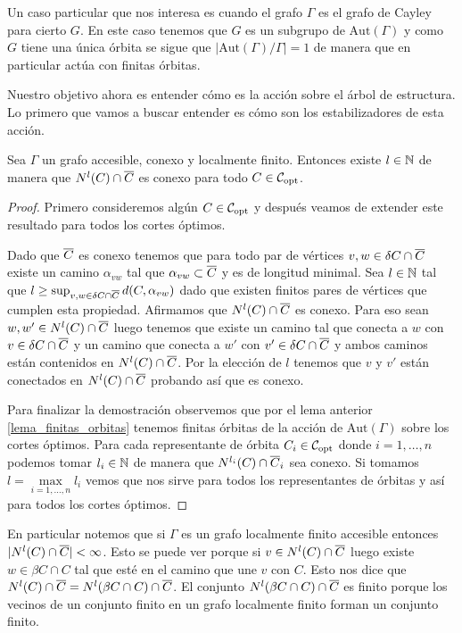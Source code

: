 \documentclass[tesis.tex]{subfiles}
\newcommand{\aut}{\text{Aut}}
\begin{document}
\begin{obs}
	Un caso particular que nos interesa es cuando el grafo $\Gamma$ es el grafo de Cayley para cierto \fg $G$.
	En este caso tenemos que $G$ es un subgrupo de $\aut(\Gamma)$ y como $G$ tiene una única órbita se sigue que $|\aut(\Gamma)/\Gamma| = 1$ de manera que en particular actúa con finitas órbitas.		
\end{obs}

Nuestro objetivo ahora es entender cómo es la acción sobre el árbol de estructura. 
Lo primero que vamos a buscar entender es cómo son los estabilizadores de esta acción.

\begin{lema}\label{lema_nlC_cap_olC_conexo}
	Sea $\Gamma$ un grafo accesible, conexo y localmente finito.
	Entonces existe $l \in \mathbb{N}$ de manera que $N^l(C) \cap \overline C$ es conexo para todo $C \in {\cal C}_{\text{opt}}$.
\end{lema}
\begin{proof}
	Primero consideremos algún $C \in {\cal C}_{\text{opt}}$ y después veamos de extender este resultado para todos los cortes óptimos.
	
	Dado que $\overline C$ es conexo tenemos que para todo par de vértices $v,w \in \delta C \cap \overline C$ existe un camino $\alpha_{vw}$ tal que $\alpha_{vw} \subset \overline C$ y es de longitud minimal.
	Sea $l \in \mathbb{N}$ tal que $l \ge \sup_{v,w \in \delta C \cap \overline C} d(C,\alpha_{vw})$ dado que existen finitos pares de vértices que cumplen esta propiedad.
	Afirmamos que $N^{l}(C) \cap \overline C$ es conexo.
	Para eso sean $w,w' \in N^{l}(C) \cap \overline C$ luego tenemos que existe un camino tal que conecta a $w$ con $v  \in \delta C \cap \overline C$ y un camino que conecta a $w'$ con $v' \in \delta C \cap \overline C$ y ambos caminos están contenidos en $N^{l}(C) \cap \overline C$.
	Por la elección de $l$ tenemos que $v$ y $v'$ están conectados en $N^l(C) \cap \overline C$ probando así que es conexo.
	

	Para finalizar la demostración observemos que por el lema anterior \ref{lema_finitas_orbitas} tenemos finitas órbitas de la acción de $\aut(\Gamma)$ sobre los cortes óptimos.
	Para cada representante de órbita $C_i \in {\cal C}_{\text{opt}}$ donde $i=1,\dots,n$ podemos tomar $l_i \in \mathbb{N}$ de manera que $ N^{l_{i}}(C_{\textit{}}) \cap \overline C_{i} $ sea conexo. 
	Si tomamos $l = \underset{{i=1,\dots,n}}{\max} l_i$ vemos que nos sirve para todos los representantes de órbitas y así para todos los cortes óptimos.
	
\end{proof}
\begin{obs}
	En particular notemos que si $\Gamma$ es un grafo localmente finito accesible entonces  $|N^l(C) \cap \overline C|<\infty$. 
	Esto se puede ver porque si $v \in N^l(C) \cap \overline C$ luego existe $w \in \beta C \cap C$ tal que esté en el camino que une $v$ con $C$.
	Esto nos dice que $N^l(C) \cap \overline C = N^l(\beta C  \cap C) \cap \overline C$. 
	El conjunto $N^l(\beta C  \cap C) \cap \overline C$ es finito porque los vecinos de un conjunto finito en un grafo localmente finito forman un conjunto finito.
\end{obs}
\end{document}
